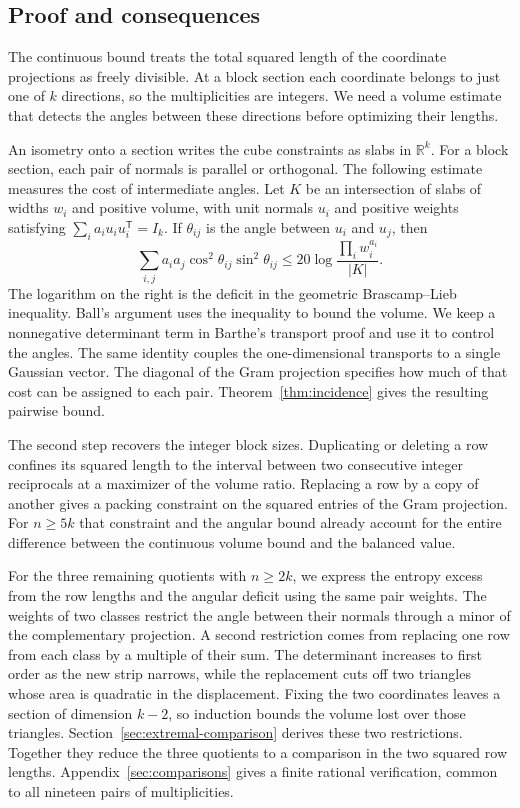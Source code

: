 \documentclass[11pt,a4paper]{article}
\theoremstyle{remark}\newtheorem{remark}[theorem]{Remark}
\numberwithin{equation}{section}
\begin{document}
\subsection{Proof and consequences}

The continuous bound treats the total squared length of the coordinate
projections as freely divisible. At a block section each coordinate
belongs to just one of \(k\) directions, so the multiplicities are
integers. We need a volume estimate that detects the angles between
these directions before optimizing their lengths.

An isometry onto a section writes the cube constraints as slabs in
\(\mathbb R^k\). For a block section, each pair of normals is parallel
or orthogonal. The following estimate measures the cost of intermediate
angles. Let \(K\) be an intersection of slabs of widths \(w_i\) and
positive volume, with unit normals \(u_i\) and positive weights satisfying
\(\sum_i a_i u_i u_i^{\mathsf T}=I_k\). If \(\theta_{ij}\) is the angle
between \(u_i\) and \(u_j\), then
\[
 \sum_{i,j}a_i a_j\cos^2\theta_{ij}\sin^2\theta_{ij}
 \le 20\log\frac{\prod_i w_i^{a_i}}{|K|}.
\]
The logarithm on the right is the deficit in the geometric
Brascamp--Lieb inequality. Ball's argument uses the inequality to
bound the volume. We keep a nonnegative determinant term in Barthe's
transport proof and use it to control the angles. The same identity
couples the one-dimensional transports to a single Gaussian vector. The diagonal of the Gram projection specifies
how much of that cost can be assigned to each pair. Theorem~\ref{thm:incidence} gives the resulting pairwise bound.

The second step recovers the integer block sizes. Duplicating or deleting a
row confines its squared length to the interval between two consecutive
integer reciprocals at a maximizer of the volume ratio. Replacing a row
by a copy of another gives a packing constraint on the squared entries
of the Gram projection. For \(n\ge5k\) that constraint and the angular
bound already account for the entire difference between the continuous
volume bound and the balanced value.

For the three remaining quotients with \(n\ge2k\), we express the
entropy excess from the row lengths and the angular deficit using the
same pair weights. The weights of two classes restrict the angle between their normals through a
minor of the complementary projection. A second restriction comes from
replacing one row from each class by a multiple of their sum. The
determinant increases to first order as the new strip narrows, while the replacement cuts off two
triangles whose area is quadratic in the displacement. Fixing the two
coordinates leaves a section of dimension \(k-2\), so induction bounds
the volume lost over those triangles. Section~\ref{sec:extremal-comparison}
derives these two restrictions. Together they reduce the three quotients
to a comparison in the two squared row lengths. Appendix~\ref{sec:comparisons}
gives a finite rational verification, common to all nineteen pairs of
multiplicities.
\end{document}
